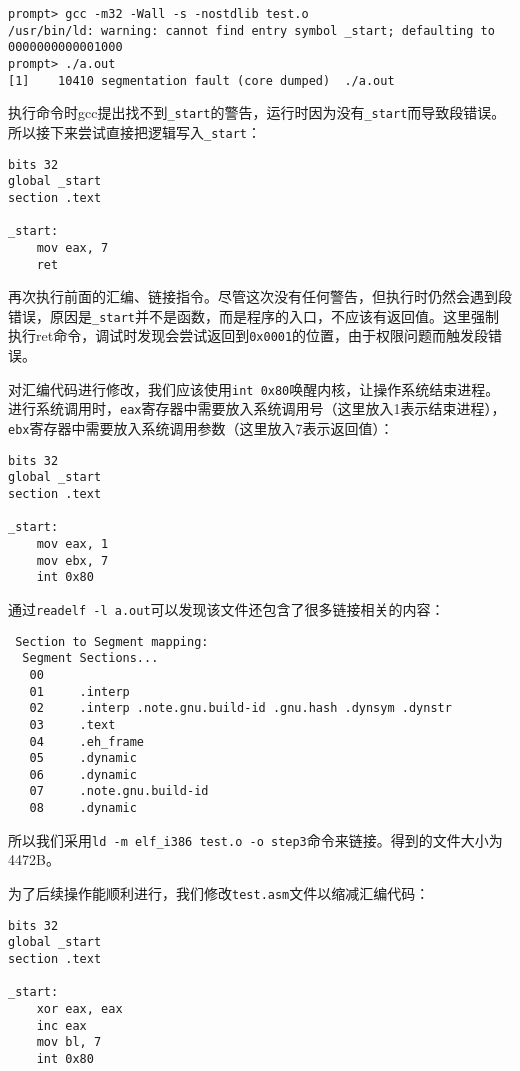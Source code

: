 \documentclass[a4paper, 11pt]{ctexart}
\begin{document}
\begin{verbatim}
prompt> gcc -m32 -Wall -s -nostdlib test.o
/usr/bin/ld: warning: cannot find entry symbol _start; defaulting to 0000000000001000
prompt> ./a.out
[1]    10410 segmentation fault (core dumped)  ./a.out
\end{verbatim}

执行命令时gcc提出找不到\texttt{\_start}的警告，运行时因为没有\texttt{\_start}而导致段错误。所以接下来尝试直接把逻辑写入\texttt{\_start}：

\begin{verbatim}
bits 32
global _start
section .text

_start:
    mov eax, 7
    ret
\end{verbatim}

再次执行前面的汇编、链接指令。尽管这次没有任何警告，但执行时仍然会遇到段错误，原因是\texttt{\_start}并不是函数，而是程序的入口，不应该有返回值。这里强制执行\textrm{ret}命令，调试时发现会尝试返回到\texttt{0x0001}的位置，由于权限问题而触发段错误。

对汇编代码进行修改，我们应该使用\texttt{int 0x80}唤醒内核，让操作系统结束进程。进行系统调用时，\texttt{eax}寄存器中需要放入系统调用号（这里放入1表示结束进程），\texttt{ebx}寄存器中需要放入系统调用参数（这里放入7表示返回值）：

\begin{verbatim}
bits 32
global _start
section .text

_start:
    mov eax, 1
    mov ebx, 7
    int 0x80
\end{verbatim}

通过\texttt{readelf -l a.out}可以发现该文件还包含了很多链接相关的内容：

\begin{verbatim}
 Section to Segment mapping:
  Segment Sections...
   00     
   01     .interp 
   02     .interp .note.gnu.build-id .gnu.hash .dynsym .dynstr 
   03     .text 
   04     .eh_frame 
   05     .dynamic 
   06     .dynamic 
   07     .note.gnu.build-id 
   08     .dynamic
\end{verbatim}

所以我们采用\texttt{ld -m elf\_i386 test.o -o step3}命令来链接。得到的文件大小为4472B。

为了后续操作能顺利进行，我们修改\texttt{test.asm}文件以缩减汇编代码：

\begin{verbatim}
bits 32
global _start
section .text

_start:
    xor eax, eax
    inc eax
    mov bl, 7
    int 0x80
\end{verbatim}
\end{document}
